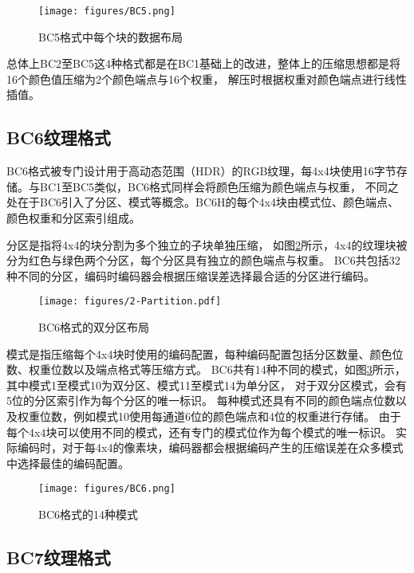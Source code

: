 \begin{figure}[htbp]
    \centering
    \texttt{[image: figures/BC5.png]}
    \caption{BC5格式中每个块的数据布局}
    \label{fig:BC5}
\end{figure}

总体上BC2至BC5这4种格式都是在BC1基础上的改进，整体上的压缩思想都是将16个颜色值压缩为2个颜色端点与16个权重，
解压时根据权重对颜色端点进行线性插值。

\subsection{BC6纹理格式}

BC6格式被专门设计用于高动态范围（HDR）的RGB纹理，每4x4块使用16字节存储。与BC1至BC5类似，BC6格式同样会将颜色压缩为颜色端点与权重，
不同之处在于BC6引入了分区、模式等概念。BC6H的每个4x4块由模式位、颜色端点、颜色权重和分区索引组成。

分区是指将4x4的块分割为多个独立的子块单独压缩，
如图\ref{fig:2-Partition}所示，4x4的纹理块被分为红色与绿色两个分区，每个分区具有独立的颜色端点与权重。
BC6共包括32种不同的分区，编码时编码器会根据压缩误差选择最合适的分区进行编码。

\begin{figure}[htbp]
    \centering
    \texttt{[image: figures/2-Partition.pdf]}
    \caption{BC6格式的双分区布局}
    \label{fig:2-Partition}
\end{figure}

模式是指压缩每个4x4块时使用的编码配置，每种编码配置包括分区数量、颜色位数、权重位数以及端点格式等压缩方式。
BC6共有14种不同的模式，如图\ref{fig:BC6}所示，其中模式1至模式10为双分区、模式11至模式14为单分区，
对于双分区模式，会有5位的分区索引作为每个分区的唯一标识。
每种模式还具有不同的颜色端点位数以及权重位数，例如模式10使用每通道6位的颜色端点和4位的权重进行存储。
由于每个4x4块可以使用不同的模式，还有专门的模式位作为每个模式的唯一标识。
实际编码时，对于每4x4的像素块，编码器都会根据编码产生的压缩误差在众多模式中选择最佳的编码配置。

\begin{figure}[htbp]
    \centering
    \texttt{[image: figures/BC6.png]}
    \caption{BC6格式的14种模式}
    \label{fig:BC6}
\end{figure}

\subsection{BC7纹理格式}

